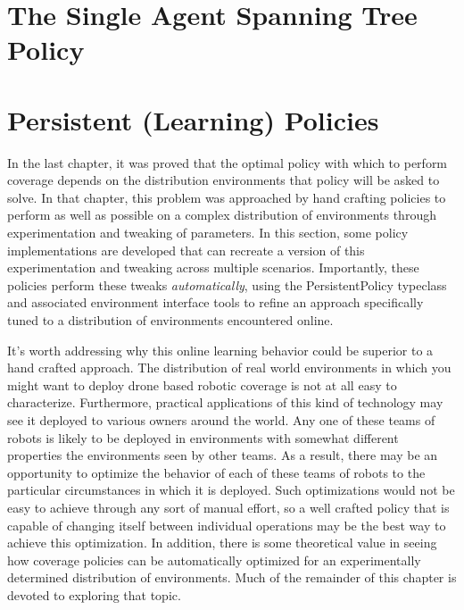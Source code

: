 \section{The Single Agent Spanning Tree Policy}


\section{Persistent (Learning) Policies}

In the last chapter, it was proved that the optimal policy with which to perform coverage depends on the distribution environments that policy will be asked to solve. In that chapter, this problem was approached by hand crafting policies to perform as well as possible on a complex distribution of environments through experimentation and tweaking of parameters. In this section, some policy implementations are developed that can recreate a version of this experimentation and tweaking across multiple scenarios. Importantly, these policies perform these tweaks \textit{automatically}, using the PersistentPolicy typeclass and associated environment interface tools to refine an approach specifically tuned to a distribution of environments encountered online.

It's worth addressing why this online learning behavior could be superior to a hand crafted approach. The distribution of real world environments in which you might want to deploy drone based robotic coverage is not at all easy to characterize. Furthermore, practical applications of this kind of  technology may see it deployed to various owners around the world. Any one of these teams of robots is likely to be deployed in environments with somewhat different properties the environments seen by other teams. As a result, there may be an opportunity to optimize the behavior of each of these teams of robots to the particular circumstances in which it is deployed. Such optimizations would not be easy to achieve through any sort of manual effort, so a well crafted policy that is capable of changing itself between individual operations may be the best way to achieve this optimization. In addition, there is some theoretical value in seeing how coverage policies can be automatically optimized for an experimentally determined distribution of environments. Much of the remainder of this chapter is devoted to exploring that topic.

